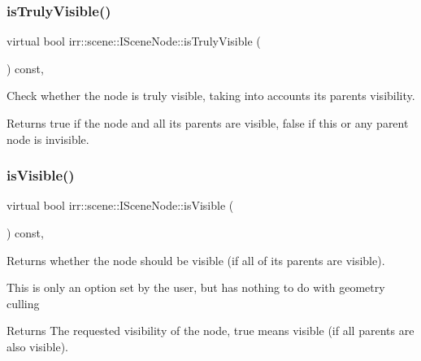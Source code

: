 \subsubsection{\texorpdfstring{is\+Truly\+Visible()}{isTrulyVisible()}\hspace{0.1cm}{\footnotesize\ttfamily [2/2]}}
{\footnotesize\ttfamily virtual bool irr\+::scene\+::\+I\+Scene\+Node\+::is\+Truly\+Visible (\begin{DoxyParamCaption}{ }\end{DoxyParamCaption}) const\hspace{0.3cm}{\ttfamily [inline]}, {\ttfamily [virtual]}}



Check whether the node is truly visible, taking into accounts its parents\textquotesingle{} visibility. 

\begin{DoxyReturn}{Returns}
true if the node and all its parents are visible, false if this or any parent node is invisible. 
\end{DoxyReturn}
\mbox{\label{classirr_1_1scene_1_1ISceneNode_a9e8e4e8be0055e8182eb26b055abf339}} 
\subsubsection{\texorpdfstring{is\+Visible()}{isVisible()}\hspace{0.1cm}{\footnotesize\ttfamily [1/2]}}
{\footnotesize\ttfamily virtual bool irr\+::scene\+::\+I\+Scene\+Node\+::is\+Visible (\begin{DoxyParamCaption}{ }\end{DoxyParamCaption}) const\hspace{0.3cm}{\ttfamily [inline]}, {\ttfamily [virtual]}}



Returns whether the node should be visible (if all of its parents are visible). 

This is only an option set by the user, but has nothing to do with geometry culling \begin{DoxyReturn}{Returns}
The requested visibility of the node, true means visible (if all parents are also visible). 
\end{DoxyReturn}
\mbox{\label{classirr_1_1scene_1_1ISceneNode_a9e8e4e8be0055e8182eb26b055abf339}} 
